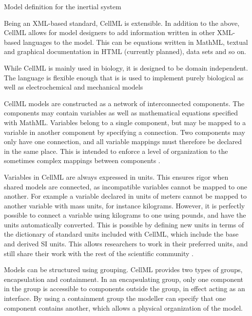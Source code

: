 \documentclass[\rootfolder/main.tex]{subfiles}
\begin{document}
\begin{listing}[ht]
    \inputminted[fontsize=\footnotesize, firstline=28]{matlab}{\rootfolder/Models/OpenCOR/Inertial.input}
    \caption{Model definition for the inertial system\label{lst:cellml-inertial-model}}
\end{listing}

Being an XML-based standard, CellML is extensible.
In addition to the above, CellML allows for model designers to add information written in other XML-based languages to the model.
This can be equations written in MathML, textual and graphical documentation in HTML (currently planned), data sets and so on.

While CellML is mainly used in biology, it is designed to be domain independent.
The language is flexible enough that is is used to implement purely biological as well as electrochemical and mechanical models \cite{cuellar2003}

CellML models are constructed as a network of interconnected components.
The components may contain variables as well as mathematical equations specified with MathML.
Variables belong to a single component, but may be mapped to a variable in another component by specifying a connection.
Two components may only have one connection, and all variable mappings must therefore be declared in the same place.
This is intended to enforce a level of organization to the sometimes complex mappings between components \cite{cuellar2003}.

Variables in CellML are always expressed in units.
This ensures rigor when shared models are connected, as incompatible variables cannot be mapped to one another.
For example a variable declared in units of meters cannot be mapped to another variable with mass units, for instance kilograms.
However, it is perfectly possible to connect a variable using kilograms to one using pounds, and have the units automatically converted.
This is possible by defining new units in terms of the dictionary of standard units included with CellML, which include the base and derived SI units.
This allows researchers to work in their preferred units, and still share their work with the rest of the scientific community \cite{cuellar2003}.

Models can be structured using grouping.
CellML provides two types of groups, encapsulation and containment.
In an encapsulating group, only one component in the group is accessible to components outside the group, in effect acting as an interface.
By using a containment group the modeller can specify that one component contains another, which allows a physical organization of the model.
\end{document}
